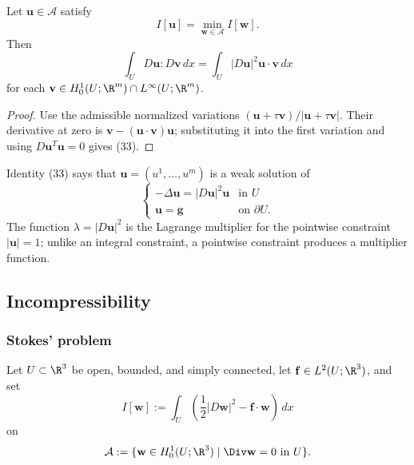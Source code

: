 \begin{theorem}
\label{thm:euler-lagrange-harmonic-maps}
Let $\mathbf{u} \in \mathcal{A}$ satisfy
\[
I[\mathbf{u}] = \min_{\mathbf{w} \in \mathcal{A}} I[\mathbf{w}].
\]
Then
\[
\int_U D\mathbf{u} : D\mathbf{v}\, dx = \int_U |D\mathbf{u}|^2 \mathbf{u} \cdot \mathbf{v}\, dx
\tag{33}
\]
for each $\mathbf{v} \in H_0^1(U;\R^m) \cap L^\infty(U;\R^m)$.
\end{theorem}

\begin{proof}
\sketch Use the admissible normalized variations $(\mathbf u+\tau\mathbf v)/|\mathbf u+\tau\mathbf v|$. Their derivative at zero is $\mathbf v-(\mathbf u\cdot\mathbf v)\mathbf u$; substituting it into the first variation and using $D\mathbf u^T\mathbf u=0$ gives (33).
\end{proof}

\begin{remark}
\label{rem:harmonic-maps-lagrange-multiplier-function}
Identity (33) says that $\mathbf u=(u^1,\ldots,u^m)$ is a weak solution of
\[
\begin{cases} -\Delta \mathbf{u} = |D\mathbf{u}|^2 \mathbf{u} & \text{in } U \\ \mathbf{u} = \mathbf{g} & \text{on } \partial U. \end{cases}
\tag{34}
\]
The function $\lambda=|D\mathbf u|^2$ is the Lagrange multiplier for the pointwise constraint $|\mathbf u|=1$; unlike an integral constraint, a pointwise constraint produces a multiplier function.
\end{remark}

\subsection{Incompressibility}
\label{sec:incompressibility-constraints}

\subsubsection{Stokes' problem}

Let $U\subset\R^3$ be open, bounded, and simply connected, let $\mathbf f\in L^2(U;\R^3)$, and set
\[
I[\mathbf w]:=\int_U\left(\frac12|D\mathbf w|^2-\mathbf f\cdot\mathbf w\right)\,dx
\]
on
\[
\mathcal A:=\{\mathbf w\in H_0^1(U;\R^3)\mid\Div\mathbf w=0\text{ in }U\}.
\]

